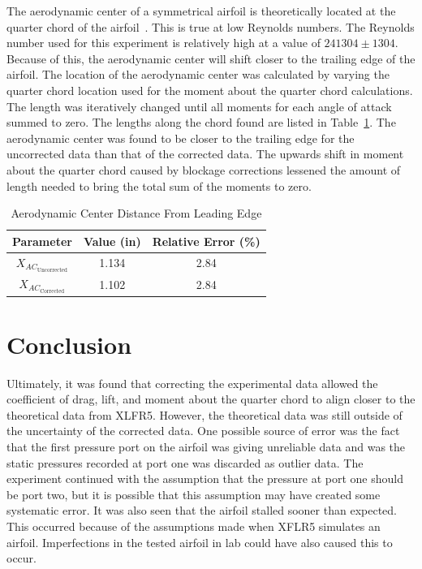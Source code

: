 \documentclass[journal,letterpaper]{IEEEtran}
\renewcommand{\arraystretch}{1.3}
\begin{document}
The aerodynamic center of a symmetrical airfoil is theoretically located at the quarter chord of the airfoil~\cite{Symmetrical}.
This is true at low Reynolds numbers.
The Reynolds number used for this experiment is relatively high at a value of $241304 \pm 1304$.
Because of this, the aerodynamic center will shift closer to the trailing edge of the airfoil.
The location of the aerodynamic center was calculated by varying the quarter chord location used for the moment about the quarter chord calculations.
The length was iteratively changed until all moments for each angle of attack summed to zero.
The lengths along the chord found are listed in Table~\ref{tab:center}.
The aerodynamic center was found to be closer to the trailing edge for the uncorrected data than that of the corrected data.
The upwards shift in moment about the quarter chord caused by blockage corrections lessened the amount of length needed to bring the total sum of the moments to zero.

\begin{table}[H]
    \centering
    \caption{Aerodynamic Center Distance From Leading Edge}
    \renewcommand{\arraystretch}{1.2}
    \begin{tabular}{ccc}
    \toprule
    Parameter & Value (in) & Relative Error (\%) \\ \midrule \midrule
    $X_{AC_\text{Uncorrected}}$ & 1.134 & 2.84 \\
    $X_{AC_\text{Corrected}}$ & 1.102 & 2.84 \\ \bottomrule
    \end{tabular}
    \label{tab:center}
\end{table}


\section{Conclusion}


Ultimately, it was found that correcting the experimental data allowed the coefficient of drag, lift, and moment about the quarter chord to align closer to the theoretical data from XLFR5.
However, the theoretical data was still outside of the uncertainty of the corrected data.
One possible source of error was the fact that the first pressure port on the airfoil was giving unreliable data and was the static pressures recorded at port one was discarded as outlier data.
The experiment continued with the assumption that the pressure at port one should be port two, but it is possible that this assumption may have created some systematic error.
It was also seen that the airfoil stalled sooner than expected.
This occurred because of the assumptions made when XFLR5 simulates an airfoil.
Imperfections in the tested airfoil in lab could have also caused this to occur.
\end{document}
